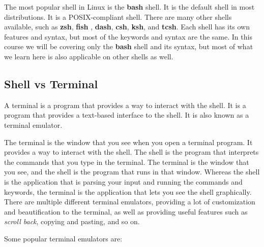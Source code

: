 The most popular shell in Linux is the \textbf{bash} shell. It is the default shell in most distributions. It is a POSIX-compliant
 shell.
There are many other shells available, such as \textbf{zsh}, \textbf{fish}
, \textbf{dash}, \textbf{csh}, \textbf{ksh}, and \textbf{tcsh}. Each shell has its own features and syntax, but most of the keywords and syntax are the same. In this course we will be covering only the \textbf{bash} shell and its syntax, but most of what we learn here is also applicable on other shells as well.

\subsection{Shell vs Terminal}

\begin{definition}[Terminal]
  A terminal is a program that provides a way to interact with the shell. It is a program that provides a text-based interface to the shell. It is also known as a terminal emulator.
\end{definition}

The terminal is the window that you see when you open a terminal program. It provides a way to interact with the shell. The shell is the program that interprets the commands that you type in the terminal. The terminal is the window that you see, and the shell is the program that runs in that window. Whereas the shell is the application that is parsing your input and running the commands and keywords, the terminal is the application that lets you see the shell graphically. There are multiple different terminal emulators, providing a lot of customization and beautification to the terminal, as well as providing useful features such as \textit{scroll back}, copying and pasting, and so on.

Some popular terminal emulators are:

